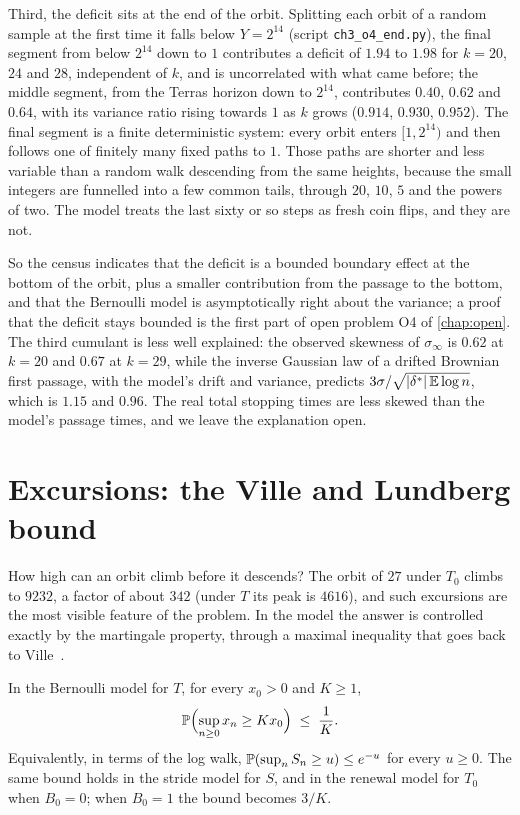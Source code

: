 Third, the deficit sits at the end of the orbit. Splitting each orbit of a random
sample at the first time it falls below $Y=2^{14}$ (script
\texttt{ch3\_o4\_end.py}), the final segment from below $2^{14}$ down to $1$
contributes a deficit of $1.94$ to $1.98$ for $k=20$, $24$ and $28$, independent
of $k$, and is uncorrelated with what came before; the middle segment, from the
Terras horizon down to $2^{14}$, contributes $0.40$, $0.62$ and $0.64$, with its variance ratio
rising towards $1$ as $k$ grows ($0.914$, $0.930$, $0.952$). The final segment is
a finite deterministic system: every orbit enters $[1,2^{14})$ and then follows
one of finitely many fixed paths to $1$. Those paths are shorter and less
variable than a random walk descending from the same heights, because the
small integers are funnelled into a few common tails, through $20$, $10$, $5$ and the
powers of two. The model treats the last sixty or so steps as fresh coin flips,
and they are not.

So the census indicates that the deficit is a bounded boundary
effect at the bottom of the orbit, plus a smaller contribution from the passage
to the bottom, and that the Bernoulli model is asymptotically right about the
variance; a proof that the deficit stays bounded is the first part of open
problem O4 of \cref{chap:open}. The third cumulant is less well explained: the observed skewness of
$\sigma_\infty$ is $0.62$ at $k=20$ and $0.67$ at $k=29$, while the inverse Gaussian law
of a drifted Brownian first passage, with the model's drift and variance,
predicts $3\sigma/\sqrt{|\delta^{*}|\,\mathbb{E}\log n}$, which is $1.15$ and $0.96$. The real
total stopping times are less skewed than the model's passage times, and we leave the explanation
open.

\section{Excursions: the Ville and Lundberg bound}\label{sec:ch3:ville}

How high can an orbit climb before it descends? The orbit of $27$ under $T_0$ climbs to
$9232$, a factor of about $342$ (under $T$ its peak is $4616$), and such excursions are the most visible
feature of the problem. In the model the answer is controlled exactly by the
martingale property, through a maximal inequality that goes back to
Ville~\cite{ville1939}.

\begin{proposition}\label{prop:ch3:ville}
In the Bernoulli model for $T$, for every $x_0>0$ and $K\geq1$,
\[
  \mathbb{P}\Bigl(\sup_{n\geq0}x_n\geq Kx_0\Bigr)\;\le\;\frac1K .
\]
Equivalently, in terms of the log walk, $\mathbb{P}(\sup_nS_n\geq u)\le e^{-u}$ for
every $u\geq0$. The same bound holds in the stride model for $S$, and in the
renewal model for $T_0$ when $B_0=0$; when $B_0=1$ the bound becomes $3/K$.
\end{proposition}

